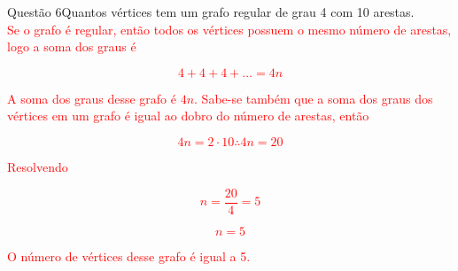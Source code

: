 \documentclass[12pt]{article}
\begin{document}
\newpage
\begin{section}{Questão 6}{Quantos vértices tem um grafo regular de grau 4 com 10 arestas.}\\

\noindent \textcolor{red}{Se o grafo é regular, então todos os vértices possuem o mesmo número de arestas, logo a soma dos graus é }

\noindent \textcolor{red}{$$ 4+4+4+\dots = 4n $$}

\noindent \textcolor{red}{A soma dos graus desse grafo é $4n$. Sabe-se também que a soma dos graus dos vértices em um grafo é igual ao dobro do número de arestas, então}

\noindent \textcolor{red}{$$ 4n = 2 \cdot 10 \therefore 4n = 20$$}

\noindent \textcolor{red}{Resolvendo}

\noindent \textcolor{red}{$$n = \dfrac{20}{4} = 5$$}

\noindent \textcolor{red}{$$\boxed{n = 5}$$}

\noindent \textcolor{red}{O número de vértices desse grafo é igual a 5.}

\end{section}
\newpage
\end{document}

